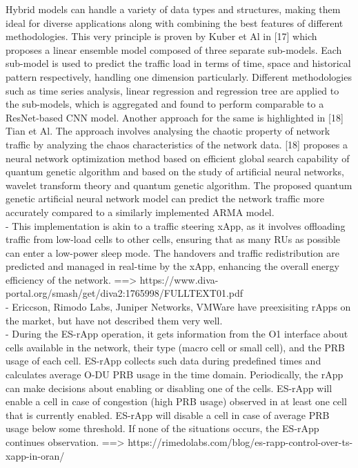 \documentclass[conference]{IEEEtran}
\begin{document}
Hybrid models can handle a variety of data types and structures, making them ideal for diverse applications along with combining the best features of different methodologies. This very principle is proven by Kuber et Al in [17] which proposes a linear ensemble model composed of three separate sub-models. Each sub-model is used to predict the traffic load in terms of time, space and historical pattern respectively, handling one dimension particularly. Different methodologies such as time series analysis, linear regression and regression tree are applied to the sub-models, which is aggregated and found to perform comparable to a ResNet-based CNN model. Another approach for the same is highlighted in [18] Tian et Al. The approach involves analysing the chaotic property of network traffic by analyzing the chaos characteristics of the network data. [18] proposes a neural network optimization method based on efficient global search capability of quantum genetic algorithm and based on the study of artificial neural networks, wavelet transform theory and quantum genetic algorithm. The proposed quantum genetic artificial neural network model can predict the network traffic more accurately compared to a similarly implemented ARMA model.\\

- This implementation is akin to a traffic steering xApp, as it involves offloading traffic from low-load cells to other cells, ensuring that as many RUs as possible can enter a low-power sleep mode. The handovers and traffic redistribution are predicted and managed in real-time by the xApp, enhancing the overall energy efficiency of the network. ==> https://www.diva-portal.org/smash/get/diva2:1765998/FULLTEXT01.pdf \\

- Ericcson, Rimodo Labs, Juniper Networks, VMWare have preexisiting rApps on the market, but have not described them very well. \\

- During the ES-rApp operation, it gets information from the O1 interface about cells available in the network, their type (macro cell or small cell), and the PRB usage of each cell. ES-rApp collects such data during predefined times and calculates average O-DU PRB usage in the time domain. Periodically, the rApp can make decisions about enabling or disabling one of the cells. ES-rApp will enable a cell in case of congestion (high PRB usage) observed in at least one cell that is currently enabled. ES-rApp will disable a cell in case of average PRB usage below some threshold. If none of the situations occurs, the ES-rApp continues observation. ==> https://rimedolabs.com/blog/es-rapp-control-over-ts-xapp-in-oran/ \\
\end{document}
